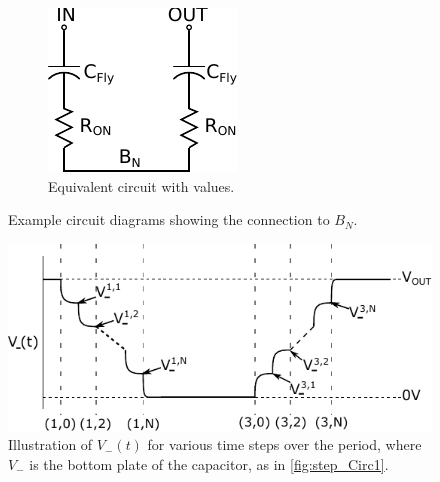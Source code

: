 \documentclass[conference]{IEEEtran}
\begin{document}
\begin{figure}
\begin{subfigure}{0.45\linewidth}
			\includegraphics[width=\linewidth]{Figures/step2_Eq.pdf}
			\caption{Equivalent circuit with values.}
			\label{fig:step_Circ2}	
		\end{subfigure}
		\caption{Example circuit diagrams showing the connection to $B_N$.}
	\end{figure}

	\begin{figure}
		\centering
		\includegraphics[width=0.9\linewidth]{Figures/V-(t).pdf}
		\caption{Illustration of $V_{-}(t)$ for various time steps over the period, where $V_-$ is the bottom plate of the capacitor, as in \ref{fig:step_Circ1}.}
		\label{fig:V-(t)}
	\end{figure}
	
\end{document}
